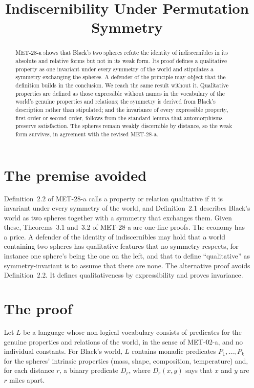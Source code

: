 \documentclass{situationist-preprint}
\title{Indiscernibility Under Permutation Symmetry}
\begin{document}
\maketitle

\begin{abstract}
MET-28-a shows that Black's two spheres refute the identity of indiscernibles in its absolute and relative forms but not in its weak form. Its proof defines a qualitative property as one invariant under every symmetry of the world and stipulates a symmetry exchanging the spheres. A defender of the principle may object that the definition builds in the conclusion. We reach the same result without it. Qualitative properties are defined as those expressible without names in the vocabulary of the world's genuine properties and relations; the symmetry is derived from Black's description rather than stipulated; and the invariance of every expressible property, first-order or second-order, follows from the standard lemma that automorphisms preserve satisfaction. The spheres remain weakly discernible by distance, so the weak form survives, in agreement with the revised MET-28-a.
\end{abstract}

\section{The premise avoided}

Definition~2.2 of MET-28-a calls a property or relation qualitative if it is invariant under every symmetry of the world, and Definition~2.1 describes Black's world as two spheres together with a symmetry that exchanges them. Given these, Theorems~3.1 and~3.2 of MET-28-a are one-line proofs. The economy has a price. A defender of the identity of indiscernibles may hold that a world containing two spheres has qualitative features that no symmetry respects, for instance one sphere's being the one on the left, and that to define \enquote{qualitative} as symmetry-invariant is to assume that there are none. The alternative proof avoids Definition~2.2. It defines qualitativeness by expressibility and proves invariance.

\section{The proof}

\begin{definition}[Vocabulary]\label{d:voc}
Let $L$ be a language whose non-logical vocabulary consists of predicates for the genuine properties and relations of the world, in the sense of MET-02-a, and no individual constants. For Black's world, $L$ contains monadic predicates $P_1, \ldots, P_k$ for the spheres' intrinsic properties (mass, shape, composition, temperature) and, for each distance $r$, a binary predicate $D_r$, where $D_r(x,y)$ says that $x$ and $y$ are $r$ miles apart.
\end{definition}
\end{document}
